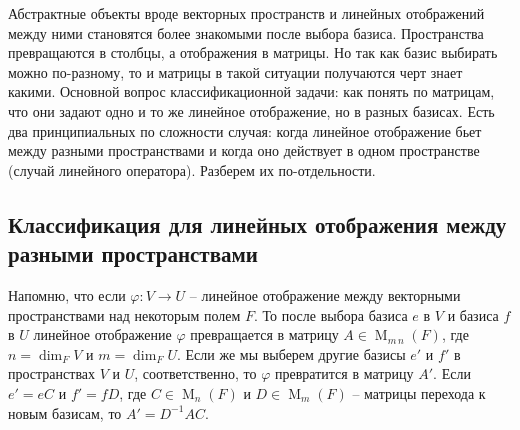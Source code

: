 Абстрактные объекты вроде векторных пространств и линейных отображений между ними становятся более знакомыми после выбора базиса.
Пространства превращаются в столбцы, а отображения в матрицы.
Но так как базис выбирать можно по-разному, то и матрицы в такой ситуации получаются черт знает какими.
Основной вопрос классификационной задачи: как понять по матрицам, что они задают одно и то же линейное отображение, но в разных базисах.
Есть два принципиальных по сложности случая: когда линейное отображение бьет между разными пространствами и когда оно действует в одном пространстве (случай линейного оператора).
Разберем их по-отдельности.

\subsection{Классификация для линейных отображения между разными пространствами}

Напомню, что если $\varphi \colon V\to U$ -- линейное отображение между векторными пространствами над некоторым полем $F$.
То после выбора базиса $e$ в $V$ и базиса $f$ в $U$ линейное отображение $\varphi$ превращается в матрицу $A\in \operatorname{M}_{m\,n}(F)$, где $n = \dim_F V$ и $m = \dim_F U$.
Если же мы выберем другие базисы $e'$ и $f'$ в пространствах $V$ и $U$, соответственно, то $\varphi$ превратится в матрицу $A'$.
Если $e' = eC$ и $f' = fD$, где $C\in \operatorname{M}_n(F)$ и $D\in\operatorname{M}_m(F)$ -- матрицы перехода к новым базисам, то $A' = D^{-1}A C$.

